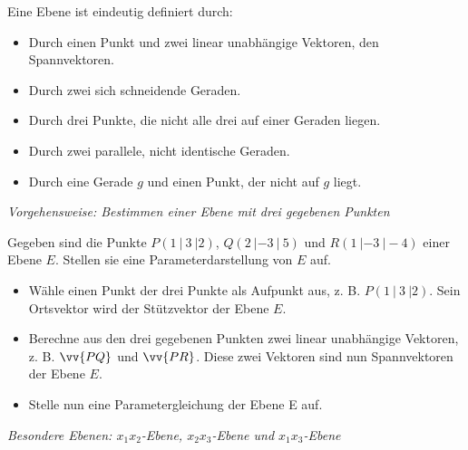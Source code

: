 \pagebreak

Eine Ebene ist eindeutig definiert durch:
\begin{itemize}
    \item Durch einen Punkt und zwei linear unabhängige Vektoren, den Spannvektoren.
    \item Durch zwei sich schneidende Geraden.
    \item Durch drei Punkte, die nicht alle drei auf einer Geraden liegen.
    \item Durch zwei parallele, nicht identische Geraden.
    \item Durch eine Gerade $g$ und einen Punkt, der nicht auf $g$ liegt.
\end{itemize}

\textit{Vorgehensweise: Bestimmen einer Ebene mit drei gegebenen Punkten}

Gegeben sind die Punkte $P(1 \ | \ 3 \ | 2)$, $Q(2 \ | -3 \ | \ 5)$ und $R(1 \ | -3 \ | -4)$ einer Ebene $E$. Stellen sie eine Parameterdarstellung von $E$ auf.
\begin{itemize}
    \item Wähle einen Punkt der drei Punkte als Aufpunkt aus, z. B. $P(1 \ | \ 3 \ | 2)$. Sein Ortsvektor wird der Stützvektor der Ebene $E$.
    \item Berechne aus den drei gegebenen Punkten zwei linear unabhängige Vektoren, z. B. $\vv{PQ}$ und $\vv{PR}$. Diese zwei Vektoren sind nun Spannvektoren der Ebene $E$.
    \item Stelle nun eine Parametergleichung der Ebene E auf.
\end{itemize}

\textit{Besondere Ebenen: $x_1x_2$-Ebene, $x_2x_3$-Ebene und $x_1x_3$-Ebene}

